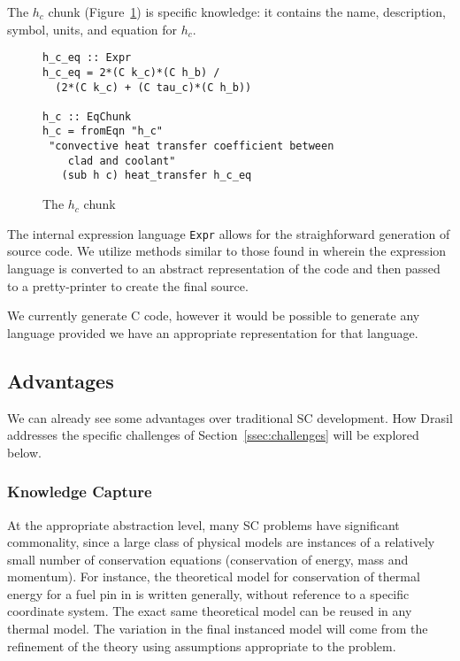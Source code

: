 \documentclass{sig-alternate-05-2015}
\newcommand{\lss}{Drasil}
\begin{document}
The $h_c$ chunk (Figure~\ref{fig:know_specific}) is specific
knowledge: it contains the name, description, symbol, units, and equation
for $h_c$.

\begin{figure}
\begin{lstlisting}[frame=single, showstringspaces=false, basicstyle=\small]
h_c_eq :: Expr
h_c_eq = 2*(C k_c)*(C h_b) /
  (2*(C k_c) + (C tau_c)*(C h_b))

h_c :: EqChunk
h_c = fromEqn "h_c" 
 "convective heat transfer coefficient between 
    clad and coolant"
   (sub h c) heat_transfer h_c_eq
\end{lstlisting}
\caption{The $h_c$ chunk}
\label{fig:know_specific}
\end{figure}

The internal expression language \lstinline|Expr|
allows for the straighforward generation of source code. We utilize methods
similar to those found in \cite{SAGA:DSL, Szymczak2014}
wherein the expression language is converted to an abstract representation of
the code and then passed to a pretty-printer to create the final source.

We currently generate C code, however it would be possible to generate any
language provided we have an appropriate representation for that language.

\subsection{Advantages} \label{ssec:advantages}

We can already see some advantages over traditional SC
development. How \lss{} addresses the specific challenges of
Section~\ref{ssec:challenges} will be explored below.

\subsubsection{Knowledge Capture} \label{sssec:adv_knowledge}

At the appropriate abstraction level, many SC problems have significant
commonality, since a large class of physical models are instances of a
relatively small number of conservation equations (conservation of energy, mass
and momentum).  For instance, the theoretical model for conservation of thermal
energy for a fuel pin in \cite{SmithAndKoothoor2016} is written generally, without
reference to a specific coordinate system.  The exact same theoretical model can
be reused in any thermal model.  The variation in the final instanced model will
come from the refinement of the theory using assumptions appropriate to the
problem.
\end{document}
